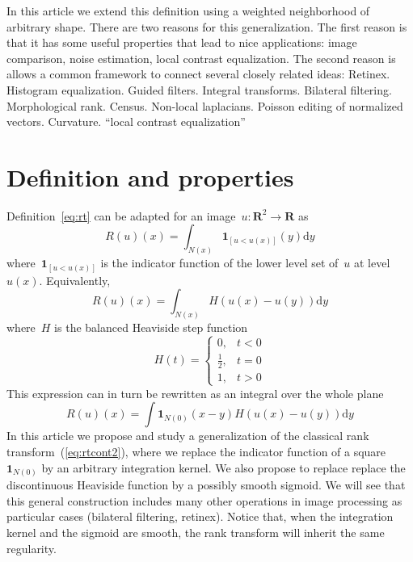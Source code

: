 \documentclass[12pt]{article}                  %
\begin{document}
In this article we extend this definition using a weighted neighborhood of
arbitrary shape.
There are two reasons for this generalization.
The first reason is that it has some useful properties that lead to nice
applications: image comparison, noise estimation, local contrast
equalization.
The second reason is allows a common framework to connect several closely
related ideas:
Retinex.  Histogram equalization.  Guided filters.  Integral transforms.
Bilateral filtering.
Morphological rank.  Census.  Non-local laplacians.  Poisson editing of
normalized vectors.  Curvature. ``local contrast equalization''
\clearpage


\section{Definition and properties}

Definition~\ref{eq:rt} can be adapted for an
image~$u:\mathbf{R}^2\to\mathbf{R}$ as
\begin{equation}\label{eq:rtcont}
	R(u)(x) = \int_{N(x)}\mathbf{1}_{\left[u < u(x)\right]}(y)\mathrm{d}y
\end{equation}
where~$\mathbf{1}_{\left[u < u(x)\right]}$ is the indicator function of the
lower level set of~$u$ at level~$u(x)$.  Equivalently,
\begin{equation}\label{eq:rtcont}
	R(u)(x) = \int_{N(x)}H(u(x)-u(y))\mathrm{d}y
\end{equation}
where~$H$ is the balanced Heaviside step function
\begin{equation}\label{eq:heaviside}
	H(t)=\begin{cases}
		0,&t< 0\\
		\frac12,&t=0\\
		1,& t>0
\end{cases}
\end{equation}
This expression can in turn be rewritten as an integral over the whole plane
\begin{equation}\label{eq:rtcont2}
	R(u)(x) = \int\mathbf{1}_{N(0)}(x-y)H(u(x)-u(y))\mathrm{d}y
\end{equation}
In this article we propose and study a generalization of the classical rank
transform~(\ref{eq:rtcont2}), where we replace the indicator function of a
square~$\mathbf{1}_{N(0)}$ by an arbitrary integration kernel.
We also propose to replace
replace the discontinuous Heaviside function by a possibly smooth sigmoid.
We will see that this general construction includes many other operations in
image processing as particular cases (bilateral filtering, retinex).
Notice that, when the integration kernel and the sigmoid are smooth, the
rank transform will inherit the same regularity.
\end{document}
